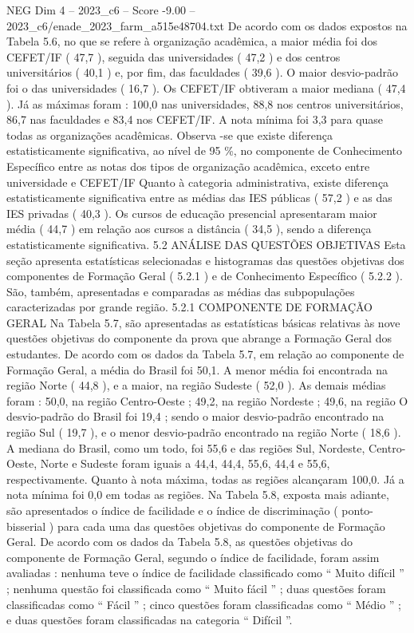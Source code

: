 \begin{textsample}{NEG Dim 4 – 2023\_c6 – Score -9.00 – 2023\_c6/enade\_2023\_farm\_a515e48704.txt}
De acordo com os dados expostos na Tabela 5.6, no que se refere à organização acadêmica, a maior média foi dos CEFET/IF ( 47,7 ), seguida das universidades ( 47,2 ) e dos centros universitários ( 40,1 ) e, por fim, das faculdades ( 39,6 ).
O maior desvio-padrão foi o das universidades ( 16,7 ).
Os CEFET/IF obtiveram a maior mediana ( 47,4 ).
Já as máximas foram : 100,0 nas universidades, 88,8 nos centros universitários, 86,7 nas faculdades e 83,4 nos CEFET/IF.
A nota mínima foi 3,3 para quase todas as organizações acadêmicas.
Observa -se que existe diferença estatisticamente significativa, ao nível de 95 \%, no componente de Conhecimento Específico entre as notas dos tipos de organização acadêmica, exceto entre universidade e CEFET/IF Quanto à categoria administrativa, existe diferença estatisticamente significativa entre as médias das IES públicas ( 57,2 ) e as das IES privadas ( 40,3 ).
Os cursos de educação presencial apresentaram maior média ( 44,7 ) em relação aos cursos a distância ( 34,5 ), sendo a diferença estatisticamente significativa. 5.2 ANÁLISE DAS QUESTÕES OBJETIVAS Esta seção apresenta estatísticas selecionadas e histogramas das questões objetivas dos componentes de Formação Geral ( 5.2.1 ) e de Conhecimento Específico ( 5.2.2 ).
São, também, apresentadas e comparadas as médias das subpopulações caracterizadas por grande região. 5.2.1 COMPONENTE DE FORMAÇÃO GERAL Na Tabela 5.7, são apresentadas as estatísticas básicas relativas às nove questões objetivas do componente da prova que abrange a Formação Geral dos estudantes.
De acordo com os dados da Tabela 5.7, em relação ao componente de Formação Geral, a média do Brasil foi 50,1.
A menor média foi encontrada na região Norte ( 44,8 ), e a maior, na região Sudeste ( 52,0 ).
As demais médias foram : 50,0, na região Centro-Oeste ; 49,2, na região Nordeste ; 49,6, na região O desvio-padrão do Brasil foi 19,4 ; sendo o maior desvio-padrão encontrado na região Sul ( 19,7 ), e o menor desvio-padrão encontrado na região Norte ( 18,6 ).
A mediana do Brasil, como um todo, foi 55,6 e das regiões Sul, Nordeste, Centro-Oeste, Norte e Sudeste foram iguais a 44,4, 44,4, 55,6, 44,4 e 55,6, respectivamente.
Quanto à nota máxima, todas as regiões alcançaram 100,0.
Já a nota mínima foi 0,0 em todas as regiões.
Na Tabela 5.8, exposta mais adiante, são apresentados o índice de facilidade e o índice de discriminação ( ponto-bisserial ) para cada uma das questões objetivas do componente de Formação Geral.
De acordo com os dados da Tabela 5.8, as questões objetivas do componente de Formação Geral, segundo o índice de facilidade, foram assim avaliadas : nenhuma teve o índice de facilidade classificado como “ Muito difícil ” ; nenhuma questão foi classificada como “ Muito fácil ” ; duas questões foram classificadas como “ Fácil ” ; cinco questões foram classificadas como “ Médio ” ; e duas questões foram classificadas na categoria “ Difícil ”.

\end{textsample}
